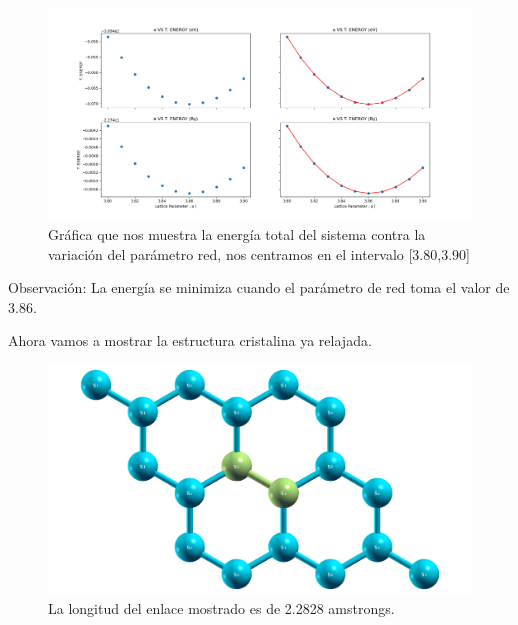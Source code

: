 \begin{figure}[H]
    \centering
    \includegraphics[scale=0.42]{images_siliceno/lattice_parameter_second_vs_T_energy.png}
    \caption{Gráfica que nos muestra la energía total del sistema contra la variación del parámetro red, nos centramos en el intervalo [3.80,3.90]}
\end{figure}

\noindent
Observación: La energía se minimiza cuando el parámetro de red toma el valor de 3.86.

\vspace{0.5cm}

\noindent
Ahora vamos a mostrar la estructura cristalina ya relajada.

\vspace{0.5cm}

\begin{figure}[H]
    \centering
    \includegraphics[scale=0.34]{images_siliceno/longitud_enlace_2_2828_amstrongs.png}
    \caption{La longitud del enlace mostrado es de 2.2828 amstrongs.}
\end{figure}

\vspace{0.5cm}


